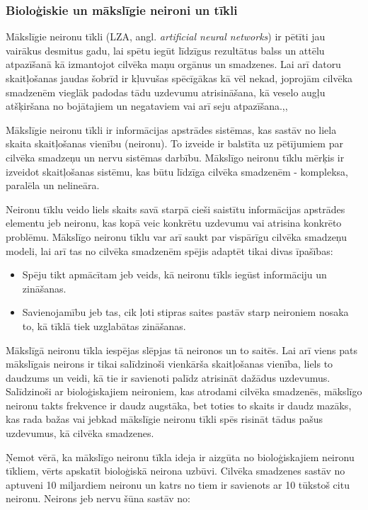 \documentclass[12pt,paper=a4]{report}
\begin{document}
\subsubsection{Bioloģiskie un mākslīgie neironi un tīkli}
Mākslīgie neironu tīkli (LZA, angl. \textit{artificial neural networks}) ir pētīti jau vairākus desmitus gadu, lai spētu iegūt līdzīgus rezultātus balss un attēlu atpazīšanā kā izmantojot cilvēka maņu orgānus un smadzenes. Lai arī datoru skaitļošanas jaudas šobrīd ir kļuvušas spēcīgākas kā vēl nekad, joprojām cilvēka smadzenēm vieglāk padodas tādu uzdevumu atrisināšana, kā veselo augļu atšķiršana no bojātajiem un negataviem vai arī seju atpazīšana.\cite{NNIntroduction1987},\cite{NNforHyperspectralIm2010},\cite{zutersNeironuTikli}\par
Mākslīgie neironu tīkli ir informācijas apstrādes sistēmas, kas sastāv no liela skaita skaitļošanas vienību (neironu). To izveide ir balstīta uz pētījumiem par cilvēka smadzeņu un nervu sistēmas darbību. Mākslīgo neironu tīklu mērķis ir izveidot skaitļošanas sistēmu, kas būtu līdzīga cilvēka smadzenēm - kompleksa, paralēla un nelineāra. \cite{krose1993introduction} \par
Neironu tīklu veido liels skaits savā starpā cieši saistītu informācijas apstrādes elementu jeb neironu, kas kopā veic konkrētu uzdevumu vai atrisina konkrēto problēmu. Mākslīgo neironu tīklu var arī saukt par vispārīgu cilvēka smadzeņu modeli, lai arī tas no cilvēka smadzenēm spējis adaptēt tikai divas īpašības:
\begin{itemize}
\item Spēju tikt apmācītam jeb veids, kā neironu tīkls iegūst informāciju un zināšanas.
\item Savienojamību jeb tas, cik ļoti stipras saites pastāv starp neironiem nosaka to, kā tīklā tiek uzglabātas zināšanas.\cite{zutersNeironuTikli}\par
\end{itemize}
Mākslīgā neironu tīkla iespējas slēpjas tā neironos un to saitēs. Lai arī viens pats mākslīgais neirons ir tikai salīdzinoši vienkārša skaitļošanas vienība, liels to daudzums un veidi, kā tie ir savienoti palīdz atrisināt dažādus uzdevumus. Salīdzinoši ar bioloģiskajiem neironiem, kas atrodami cilvēka smadzenēs, mākslīgo neironu takts frekvence ir daudz augstāka, bet toties to skaits ir daudz mazāks, kas rada bažas vai jebkad mākslīgie neironu tīkli spēs risināt tādus pašus uzdevumus, kā cilvēka smadzenes.\cite{zutersNeironuTikli}\par
Ņemot vērā, ka mākslīgo neironu tīkla ideja ir aizgūta no bioloģiskajiem neironu tīkliem, vērts apskatīt bioloģiskā neirona uzbūvi. Cilvēka smadzenes sastāv no aptuveni 10 miljardiem neironu un katrs no tiem ir savienots ar 10 tūkstoš citu neironu. Neirons jeb nervu šūna sastāv no:
\end{document}

